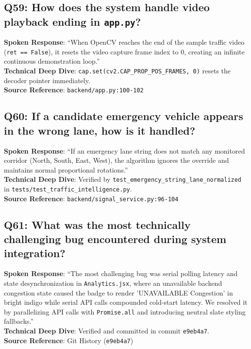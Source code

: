 \documentclass[11pt,a4paper,oneside]{report}
\begin{document}
\subsection*{Q59: How does the system handle video playback ending in \texttt{app.py}?}
\begin{interviewbox}
\textbf{Spoken Response}: ``When OpenCV reaches the end of the sample traffic video (\texttt{ret == False}), it resets the video capture frame index to 0, creating an infinite continuous demonstration loop.''\\
\textbf{Technical Deep Dive}: \texttt{cap.set(cv2.CAP\_PROP\_POS\_FRAMES, 0)} resets the decoder pointer immediately.\\
\textbf{Source Reference}: \texttt{backend/app.py:100-102}
\end{interviewbox}

\subsection*{Q60: If a candidate emergency vehicle appears in the wrong lane, how is it handled?}
\begin{interviewbox}
\textbf{Spoken Response}: ``If an emergency lane string does not match any monitored corridor (North, South, East, West), the algorithm ignores the override and maintains normal proportional rotations.''\\
\textbf{Technical Deep Dive}: Verified by \texttt{test\_emergency\_string\_lane\_normalized} in \texttt{tests/test\_traffic\_intelligence.py}.\\
\textbf{Source Reference}: \texttt{backend/signal\_service.py:96-104}
\end{interviewbox}

\subsection*{Q61: What was the most technically challenging bug encountered during system integration?}
\begin{interviewbox}
\textbf{Spoken Response}: ``The most challenging bug was serial polling latency and state desynchronization in \texttt{Analytics.jsx}, where an unavailable backend congestion state caused the badge to render 'UNAVAILABLE Congestion' in bright indigo while serial API calls compounded cold-start latency. We resolved it by parallelizing API calls with \texttt{Promise.all} and introducing neutral slate styling fallbacks.''\\
\textbf{Technical Deep Dive}: Verified and committed in commit \texttt{e9eb4a7}.\\
\textbf{Source Reference}: Git History (\texttt{e9eb4a7})
\end{interviewbox}
\end{document}
